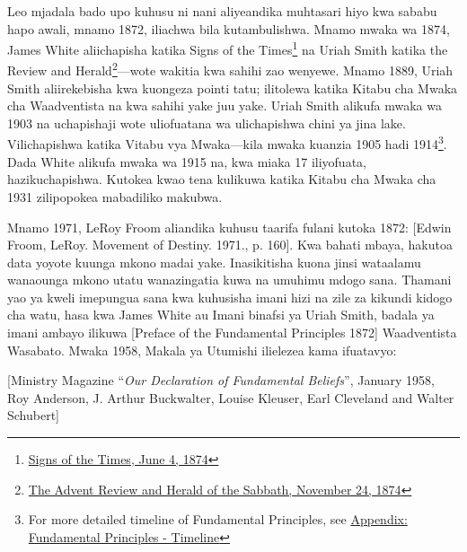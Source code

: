 Leo mjadala bado upo kuhusu ni nani aliyeandika muhtasari hiyo kwa sababu hapo awali, mnamo 1872, iliachwa bila kutambulishwa. Mnamo mwaka wa 1874, James White aliichapisha katika Signs of the Times\footnote{\href{https://adventistdigitallibrary.org/adl-364148/signs-times-june-4-1874}{Signs of the Times, June 4, 1874}} na Uriah Smith katika the Review and Herald\footnote{\href{http://documents.adventistarchives.org/Periodicals/RH/RH18741124-V44-22.pdf}{The Advent Review and Herald of the Sabbath, November 24, 1874}}—wote wakitia kwa sahihi zao wenyewe. Mnamo 1889, Uriah Smith aliirekebisha kwa kuongeza pointi tatu; ilitolewa katika Kitabu cha Mwaka cha Waadventista na kwa sahihi yake juu yake. Uriah Smith alikufa mwaka wa 1903 na uchapishaji wote uliofuatana wa  ulichapishwa chini ya jina lake. Vilichapishwa katika Vitabu vya Mwaka—kila mwaka kuanzia 1905 hadi 1914\footnote{For more detailed timeline of Fundamental Principles, see \hyperref[appendix:timeline]{Appendix: Fundamental Principles - Timeline}}. Dada White alikufa mwaka wa 1915 na, kwa miaka 17 iliyofuata,  hazikuchapishwa. Kutokea kwao tena kulikuwa katika Kitabu cha Mwaka cha 1931 zilipopokea mabadiliko makubwa.

Mnamo 1971, LeRoy Froom aliandika kuhusu taarifa fulani kutoka 1872: [Edwin Froom, LeRoy. Movement of Destiny. 1971., p. 160]. Kwa bahati mbaya, hakutoa data yoyote kuunga mkono madai yake. Inasikitisha kuona jinsi wataalamu wanaounga mkono utatu wanazingatia  kuwa na umuhimu mdogo sana. Thamani yao ya kweli imepungua sana kwa kuhusisha imani hizi na zile za kikundi kidogo cha watu, hasa kwa James White au Imani binafsi ya Uriah Smith, badala ya imani ambayo ilikuwa [Preface of the Fundamental Principles 1872] Waadventista Wasabato. Mwaka 1958, Makala ya Utumishi ilielezea  kama ifuatavyo:

[Ministry Magazine “\textit{Our Declaration of Fundamental Beliefs}”, January 1958, Roy Anderson, J. Arthur Buckwalter, Louise Kleuser, Earl Cleveland and Walter Schubert]

